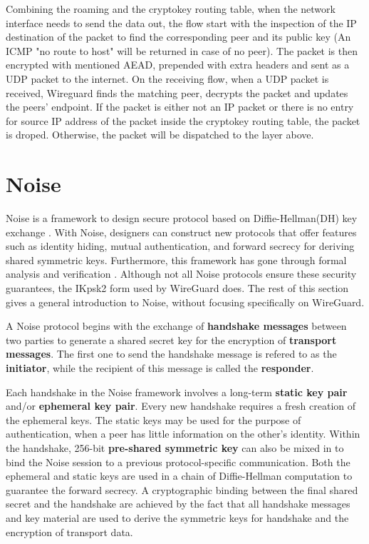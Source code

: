   Combining the roaming and the cryptokey routing table, when the network interface needs
  to send the data out, the flow start with the inspection of the IP destination of the packet 
  to find the corresponding peer and its public key (An ICMP "no route to host" will be returned
  in case of no peer). The packet is then encrypted with mentioned AEAD, prepended with
  extra headers and sent as a UDP packet to the internet. On the receiving flow, when a UDP packet
  is received, Wireguard finds the matching peer, decrypts the packet and updates the peers' endpoint.
  If the packet is either not an IP packet or there is no entry for source IP address of the packet
  inside the cryptokey routing table, the packet is droped. Otherwise, the packet will be dispatched
  to the layer above.
\section{Noise} \label{w2}
  Noise \cite{noise} is a framework to design secure protocol based on Diffie-Hellman(DH) key exchange \cite{dh}.
  With Noise, designers can construct new protocols that offer features such as identity hiding,
  mutual authentication, and forward secrecy for deriving shared symmetric keys. Furthermore, this
  framework has gone through formal analysis and verification \cite{noise_ex}. Although not all 
  Noise protocols ensure these security guarantees, the IKpsk2 form used by WireGuard does. 
  The rest of this section gives a general introduction to Noise, without focusing specifically on WireGuard.

  A Noise protocol begins with the exchange of \textbf{handshake messages} between two parties to
  generate a shared secret key for the encryption of \textbf{transport messages}. The first one
  to send the handshake message is refered to as the \textbf{initiator}, while the recipient of
  this message is called the \textbf{responder}.

  Each handshake in the Noise framework involves a long-term \textbf{static key pair} and/or
  \textbf{ephemeral key pair}. Every new handshake requires a fresh creation of the ephemeral
  keys. The static keys may be used for the purpose of authentication, when a peer has little
  information on the other's identity. Within the handshake, 256-bit \textbf{pre-shared symmetric key}
  can also be mixed in to bind the Noise session to a previous protocol-specific communication.
  Both the ephemeral and static keys are used in a chain of Diffie-Hellman computation to guarantee
  the forward secrecy. A cryptographic binding between the final shared secret and the handshake
  are achieved by the fact that all handshake messages and key material are used to derive
  the symmetric keys for handshake and the encryption of transport data.

